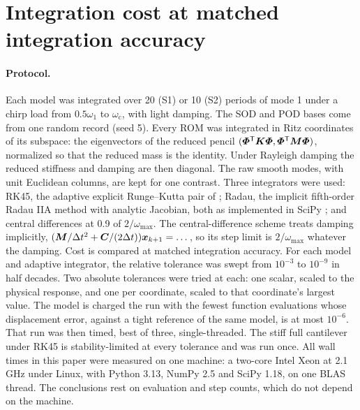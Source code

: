 \documentclass[11pt]{article}
\begin{document}
\section{Integration cost at matched integration accuracy}\label{sec:s-cost}
\paragraph{Protocol.} Each model was integrated over 20 (S1) or 10 (S2) periods of mode 1 under a chirp load from $0.5\omega_1$ to $\omega_{\mathrm c}$, with light damping. The SOD and POD bases come from one random record (seed 5).
Every ROM was integrated in Ritz coordinates of its subspace: the eigenvectors of the reduced pencil $(\bm{\varPhi}^{\mathsf T}\bm{K}\bm{\varPhi},\bm{\varPhi}^{\mathsf T}\bm{M}\bm{\varPhi})$, normalized so that the reduced mass is the identity. Under Rayleigh damping the reduced stiffness and damping are then diagonal. The raw smooth modes, with unit Euclidean columns, are kept for one contrast.
Three integrators were used: RK45, the adaptive explicit Runge--Kutta pair of \citet{Dormand1980}; Radau, the implicit fifth-order Radau IIA method \citep{Hairer1996} with analytic Jacobian, both as implemented in SciPy \citep{Virtanen2020}; and central differences at 0.9 of $2/\omega_{\max}$. The central-difference scheme treats damping implicitly, $(\bm{M}/\Delta t^2+\bm{C}/(2\Delta t))\bm{x}_{k+1}=\dots$, so its step limit is $2/\omega_{\max}$ whatever the damping.
Cost is compared at matched integration accuracy. For each model and adaptive integrator, the relative tolerance was swept from $10^{-3}$ to $10^{-9}$ in half decades. Two absolute tolerances were tried at each: one scalar, scaled to the physical response, and one per coordinate, scaled to that coordinate's largest value. The model is charged the run with the fewest function evaluations whose displacement error, against a tight reference of the same model, is at most $10^{-6}$. That run was then timed, best of three, single-threaded. The stiff full cantilever under RK45 is stability-limited at every tolerance and was run once.
All wall times in this paper were measured on one machine: a two-core Intel Xeon at 2.1\,GHz under Linux, with Python 3.13, NumPy 2.5 and SciPy 1.18, on one BLAS thread. The conclusions rest on evaluation and step counts, which do not depend on the machine.

\begin{table}[t]
\centering\small
\caption{Integration cost at matched integration accuracy: the least work to reach a displacement error of $10^{-6}$; light Rayleigh damping, chirp load. ROMs in Ritz coordinates of their subspace; ``raw'' is the same SOD subspace in unit-Euclidean smooth modes. $\rho(\bm{A}_r)$: spectral radius of the first-order state matrix. CD: central-difference steps at 0.9 of $2/\omega_{\max}$. LU: Radau matrix factorizations. --: the single stability-limited RK45 run did not reach $10^{-6}$. Script: \texttt{c36\_cost\_matched.py}, table \texttt{mktab\_c\_cost.py}.}
\label{tab:cost}
\resizebox{\textwidth}{!}{}
\end{table}
\end{document}
